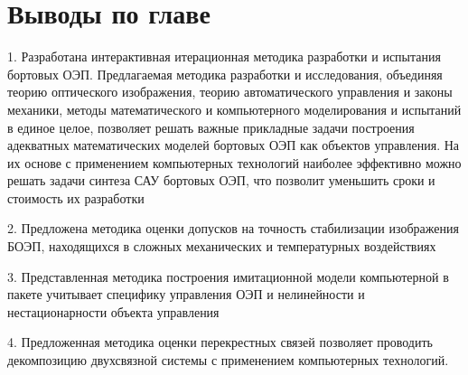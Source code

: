 \begin{comment}
\textbf{Испытания на борту}
 в соответствии с методиками натурных испытаний и требований ТЗ. Если критерии (\labelcref{eq:p2:2}) не выполняются, то переходим на проводится анализ результатов и возврат к доопределению модели или ТЗ. Результаты испытаний и требования к техническим характеристикам СВ и САУ фиксируем в протоколе испытаний и делаем заключение о необходимости доработок СВ и САУ или допуске их к дальнейшему производству.
\end{comment}
\begin{comment}
Приведенная методика была апробирована при разработке ряда САУ ОЭП \cite[]{Belyakov}, \cite[]{Torshina},\cite[]{Malivanov-a2-9}, \cite[]{Burdinov-a2-10}, \cite[]{Sokolski22}, \cite[]{Dubovik-a2-12}. Каждому из блоков на рисунке~\ref{fig:tikz_example} присущи своя специфика и его математическое или логическое описание и предполагается соответствующая методика его реализации. Сущность их раскроем ниже.
\end{comment}

\section{Выводы по главе} \label{sec:ch2/sec9}

1. Разработана интерактивная итерационная методика разработки и испытания бортовых ОЭП. Предлагаемая методика разработки и исследования, объединяя теорию оптического изображения, теорию автоматического управления и законы механики, методы математического и компьютерного моделирования и испытаний в единое целое, позволяет решать важные прикладные задачи построения адекватных математических моделей бортовых ОЭП как объектов управления. На их основе с применением компьютерных технологий наиболее эффективно можно решать задачи синтеза САУ бортовых ОЭП, что позволит уменьшить сроки и стоимость их разработки

2. Предложена методика оценки допусков на точность стабилизации изображения БОЭП, находящихся в сложных механических и температурных воздействиях

3.  Представленная методика построения имитационной модели компьютерной в пакете учитывает специфику управления ОЭП и нелинейности и нестационарности объекта управления 

4. Предложенная методика оценки перекрестных связей позволяет проводить декомпозицию двухсвязной системы с применением компьютерных технологий.

\clearpage